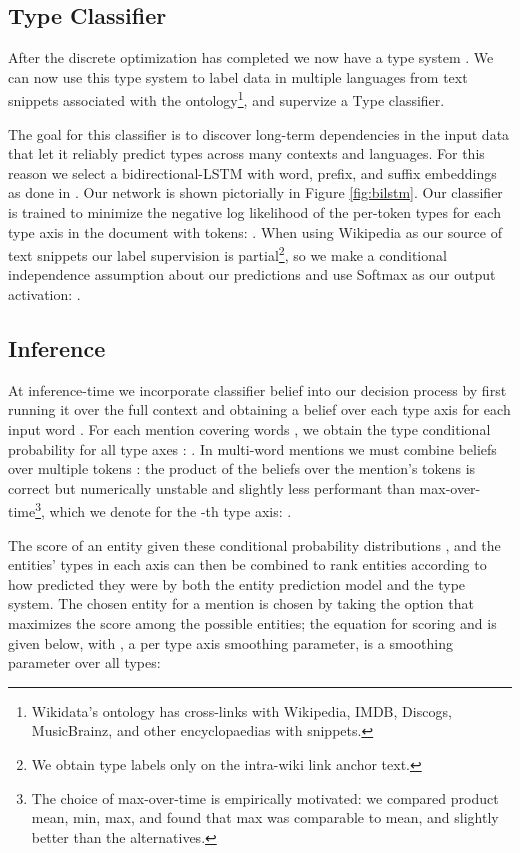 \documentclass[letterpaper]{article}
\begin{document}
\subsection{Type Classifier}
\label{section:typeclassifier}

After the discrete optimization has completed we now have a type system  . We can now use this type system to label data in multiple languages from text snippets associated with the ontology\footnote{Wikidata's ontology has cross-links with Wikipedia, IMDB, Discogs, MusicBrainz, and other encyclopaedias with snippets.}, and supervize a Type classifier.

The goal for this classifier is to discover long-term dependencies in the input data that let it reliably predict types across many contexts and languages. For this reason we select a bidirectional-LSTM \cite{lample2016neural} with word, prefix, and suffix embeddings as done in \cite{andor2016globally}. Our network is shown pictorially in Figure \ref{fig:bilstm}.
Our classifier is trained to minimize the negative log likelihood of the per-token types for each type axis in the document  with  tokens: . When using Wikipedia as our source of text snippets our label supervision is partial\footnote{We obtain type labels only on the intra-wiki link anchor text.}, so we make a conditional independence assumption about our predictions and use Softmax as our output activation:
.

\subsection{Inference}
\label{para:inference-el}
At inference-time we incorporate classifier belief into our decision process by first running it over the full context and obtaining a belief over each type axis for each input word . For each mention  covering words , we obtain the type conditional probability for all type axes : . In multi-word mentions we must combine beliefs over multiple tokens : the product of the beliefs over the mention's tokens is correct but numerically unstable and slightly less performant than max-over-time\footnote{The choice of max-over-time is empirically motivated: we compared product mean, min, max, and found that max was comparable to mean, and slightly better than the alternatives.}, which we denote for the -th type axis: .

The score   of an entity  given these conditional probability distributions , and the entities' types in each axis  can then be combined to rank entities according to how predicted they were by both the entity prediction model and the type system. The chosen entity  for a mention  is chosen by taking the option that maximizes the score among the  possible entities; the equation for scoring and  is given below, with ,  a per type axis smoothing parameter,  is a smoothing parameter over all types:
\end{document}
